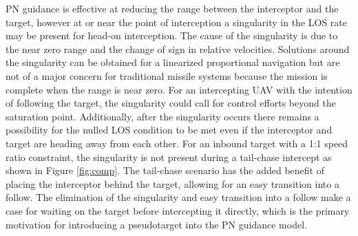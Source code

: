\documentclass[]{aiaa-tc}%
\begin{document}
PN guidance is effective at reducing the range between the interceptor and the target, however at or near the point of interception a singularity in the LOS rate may be present for head-on interception. The cause of the singularity is due to the near zero range and the change of sign in relative velocities. Solutions around the singularity can be obtained for a linearized proportional navigation \cite{singularitySolution} but are not of a major concern for traditional missile systems because the mission is complete when the range is near zero. For an intercepting UAV with the intention of following the target, the singularity could call for control efforts beyond the saturation point. Additionally, after the singularity occurs there remains a possibility for the nulled LOS condition to be met even if the interceptor and target are heading away from each other. For an inbound target with a 1:1 speed ratio constraint, the singularity is not present during a tail-chase intercept as shown in Figure \ref{fig:comp}. The tail-chase scenario has the added benefit of placing the interceptor behind the target, allowing for an easy transition into a follow. The elimination of the singularity and easy transition into a follow make a case for waiting on the target before intercepting it directly, which is the primary motivation for introducing a pseudotarget into the PN guidance model.




\end{document}
